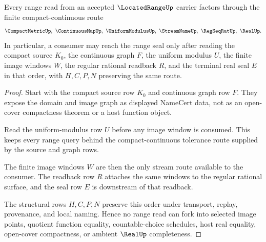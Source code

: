 \begin{theorem}
\label{thm:located-range-compact-continuous-handoff}
Every range read from an accepted $\LocatedRangeUp$ carrier factors through the finite compact-continuous route
$$
\CompactMetricUp,\ \ContinuousMapUp,\ \UniformModulusUp,\ \StreamNameUp,\ \RegSeqRatUp,\ \RealUp .
$$
In particular, a consumer may reach the range seal only after reading the compact source $K_0$, the continuous graph $F$, the uniform modulus $U$, the finite image windows $W$, the regular rational readback $R$, and the terminal real seal $E$ in that order, with $H,C,P,N$ preserving the same route.
\end{theorem}
\begin{proof}
Start with the compact source row $K_0$ and continuous graph row $F$. They expose the domain and image graph as displayed NameCert data, not as an open-cover compactness theorem or a host function object.

Read the uniform-modulus row $U$ before any image window is consumed. This keeps every range query behind the compact-continuous tolerance route supplied by the source and graph rows.

The finite image windows $W$ are then the only stream route available to the consumer. The readback row $R$ attaches the same windows to the regular rational surface, and the seal row $E$ is downstream of that readback.

The structural rows $H,C,P,N$ preserve this order under transport, replay, provenance, and local naming. Hence no range read can fork into selected image points, quotient function equality, countable-choice schedules, host real equality, open-cover compactness, or ambient $\RealUp$ completeness.
\end{proof}



